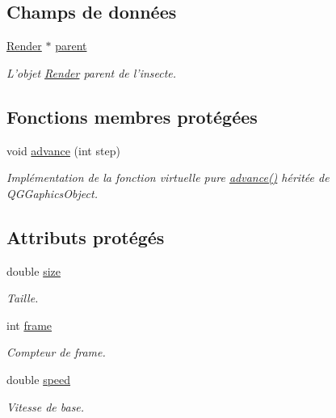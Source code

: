 \subsection*{Champs de données}
\begin{DoxyCompactItemize}
\item 
\hyperlink{classRender}{Render} $\ast$ \hyperlink{classBug_a7a93aae4e4b7a215c94ff85d0bd6e26d}{parent}
\begin{DoxyCompactList}\small\item\em L'objet \hyperlink{classRender}{Render} parent de l'insecte. \end{DoxyCompactList}\end{DoxyCompactItemize}
\subsection*{Fonctions membres protégées}
\begin{DoxyCompactItemize}
\item 
void \hyperlink{classBug_a8e0ea03e85c9324a13328da60e5c52ee}{advance} (int step)
\begin{DoxyCompactList}\small\item\em Implémentation de la fonction virtuelle pure \hyperlink{classBug_a8e0ea03e85c9324a13328da60e5c52ee}{advance()} héritée de QGGaphicsObject. \end{DoxyCompactList}\end{DoxyCompactItemize}
\subsection*{Attributs protégés}
\begin{DoxyCompactItemize}
\item 
double \hyperlink{classBug_a27a0f0b84d15525e409955509e6e3c42}{size}
\begin{DoxyCompactList}\small\item\em Taille. \end{DoxyCompactList}\item 
int \hyperlink{classBug_ad7e3597cf049f1051be94fcaf2fd3598}{frame}
\begin{DoxyCompactList}\small\item\em Compteur de frame. \end{DoxyCompactList}\item 
double \hyperlink{classBug_a13b95fbf23748ea853b01bfd0b0e7fc8}{speed}
\begin{DoxyCompactList}\small\item\em Vitesse de base. \end{DoxyCompactList}\end{DoxyCompactItemize}

